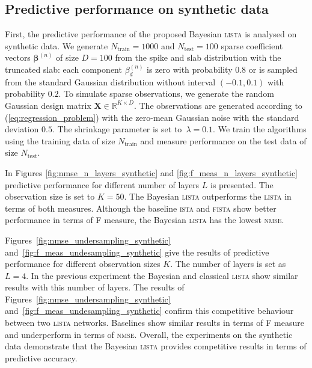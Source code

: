 \documentclass{article}
\begin{document}
\subsection{Predictive performance on synthetic data}
First, the predictive performance of the proposed Bayesian \textsc{lista} is analysed on synthetic data. We generate $N_\text{train}=1000$ and $N_{\text{test}} = 100$ sparse coefficient vectors $\boldsymbol\beta^{(n)}$ of size $D = 100$  from the spike and slab distribution with the truncated slab: each component $\beta^{(n)}_{d}$ is zero with probability $0.8$ or is sampled from the standard Gaussian distribution without interval $(-0.1, 0.1)$ with probability $0.2$. To simulate sparse observations, we generate the random Gaussian design matrix $\mathbf{X} \in \mathbb{R}^{K \times D}$.  The observations are generated according to (\ref{eq:regression_problem}) with the zero-mean Gaussian noise with the standard deviation $0.5$. The shrinkage parameter is set to~$\lambda = 0.1$. We train the algorithms using the training data of size $N_\text{train}$ and measure performance on the test data of size $N_{\text{test}}$.

In Figures \ref{fig:nmse_n_layers_synthetic} and \ref{fig:f_meas_n_layers_synthetic} predictive performance for different number of layers $L$ is presented. The observation size is set to $K=50$. The Bayesian \textsc{lista} outperforms the \textsc{lista} in terms of both measures. Although the baseline \textsc{ista} and \textsc{fista} show better performance in terms of F measure, the Bayesian \textsc{lista} has the lowest \textsc{nmse}.

Figures~\ref{fig:nmse_undersampling_synthetic} and~\ref{fig:f_meas_undesampling_synthetic} give the results of predictive performance for different observation sizes $K$. The number of layers is set as $L=4$. In the previous experiment the Bayesian and classical \textsc{lista} show similar results with this number of layers. The results of Figures~\ref{fig:nmse_undersampling_synthetic} and~\ref{fig:f_meas_undesampling_synthetic} confirm this competitive behaviour between two \textsc{lista} networks. Baselines show similar results in terms of F measure and underperform in terms of \textsc{nmse}. Overall, the experiments on the synthetic data demonstrate that the Bayesian \textsc{lista} provides competitive results in terms of predictive accuracy.

\end{document}
